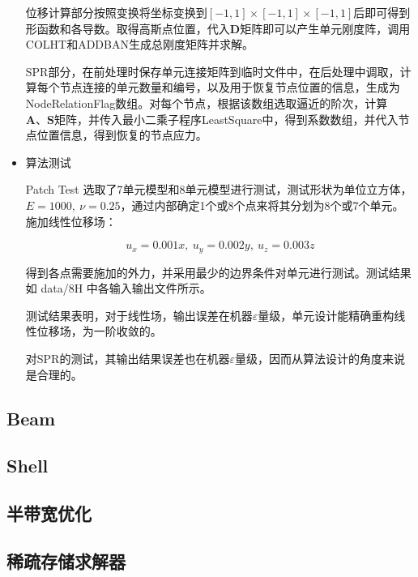 \documentclass[UTF8]{ctexbook}
\begin{document}
\begin{itemize}
位移计算部分按照变换将坐标变换到$[-1,1]\times[-1,1]\times[-1,1]$后即可得到形函数和各导数。取得高斯点位置，代入$\boldsymbol{D}$矩阵即可以产生单元刚度阵，调用COLHT和ADDBAN生成总刚度矩阵并求解。


SPR部分，在前处理时保存单元连接矩阵到临时文件中，在后处理中调取，计算每个节点连接的单元数量和编号，以及用于恢复节点位置的信息，生成为NodeRelationFlag数组。对每个节点，根据该数组选取逼近的阶次，计算$\boldsymbol{A}\text{、}\boldsymbol{S}$矩阵，并传入最小二乘子程序LeastSquare中，得到系数数组，并代入节点位置信息，得到恢复的节点应力。

\item 算法测试


Patch Test 选取了7单元模型和8单元模型进行测试，测试形状为单位立方体，$E=1000,\ \nu=0.25$，通过内部确定1个或8个点来将其分划为8个或7个单元。施加线性位移场：


\[
u_{x}=0.001x,\ u_{y}=0.002y,\ u_{z}=0.003z
\]



得到各点需要施加的外力，并采用最少的边界条件对单元进行测试。测试结果如 data/8H 中各输入输出文件所示。


测试结果表明，对于线性场，输出误差在机器$\varepsilon$量级，单元设计能精确重构线性位移场，为一阶收敛的。


对SPR的测试，其输出结果误差也在机器$\varepsilon$量级，因而从算法设计的角度来说是合理的。




\end{itemize}


\subsection{Beam}

\subsection{Shell}

\subsection{半带宽优化}

\subsection{稀疏存储求解器}

\end{document}
